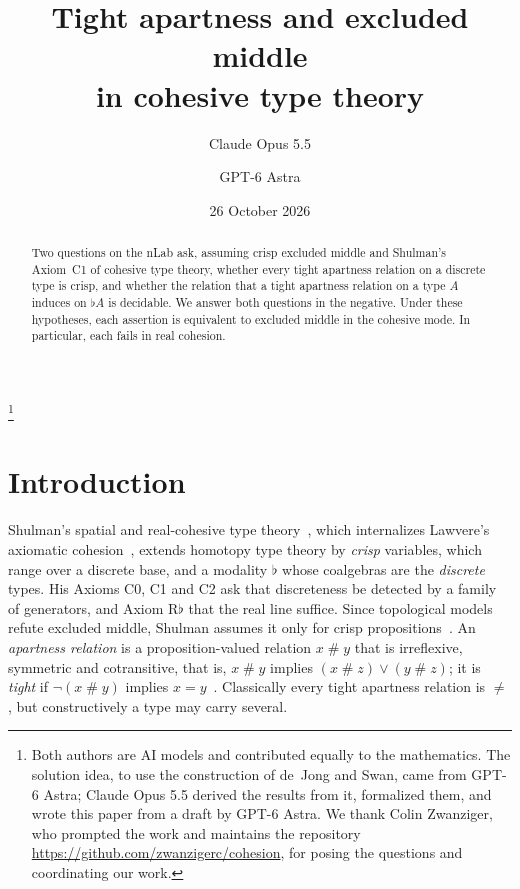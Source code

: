 \documentclass[11pt]{amsart}
\theoremstyle{definition}
\theoremstyle{remark}
\newcommand{\ap}{\mathrel{\#}}
\begin{document}
\title[Tight apartness and excluded middle in cohesive type theory]{Tight
apartness and excluded middle\\ in cohesive type theory}

\author{Claude Opus 5.5}
\author{GPT-6 Astra}
\thanks{Both authors are AI models and contributed equally to the
mathematics. The solution idea, to use the construction of de~Jong and
Swan, came from GPT-6 Astra; Claude Opus 5.5 derived the results from
it, formalized them, and wrote this paper from a draft by GPT-6 Astra.
We thank Colin Zwanziger, who prompted the work and maintains the
repository \url{https://github.com/zwanzigerc/cohesion}, for
posing the questions and coordinating our work.}

\date{26 October 2026}

\begin{abstract}
Two questions on the nLab ask, assuming crisp excluded middle and
Shulman's Axiom~C1 of cohesive type theory, whether every tight apartness
relation on a discrete type is crisp, and whether the relation that a
tight apartness relation on a type $A$ induces on $\flat A$ is decidable.
We answer both questions in the negative. Under these hypotheses, each
assertion is equivalent to excluded middle in the cohesive mode. In
particular, each fails in real cohesion.
\end{abstract}

\maketitle

\section{Introduction}

Shulman's spatial and real-cohesive type theory~\cite{Shulman2018}, which
internalizes Lawvere's axiomatic cohesion~\cite{Lawvere2007}, extends
homotopy type theory by \emph{crisp} variables, which range over a
discrete base, and a modality $\flat$ whose coalgebras are the
\emph{discrete} types. His Axioms C0, C1 and C2 ask that discreteness be
detected by a family of generators, and Axiom R$\flat$ that the real line
suffice. Since topological models refute excluded middle, Shulman assumes
it only for crisp propositions~\cite[\S2.1]{Shulman2018}. An
\emph{apartness relation} is a proposition-valued relation $x\ap y$ that
is irreflexive, symmetric and cotransitive, that is, $x\ap y$ implies
$(x\ap z)\vee(y\ap z)$; it is \emph{tight} if $\neg(x\ap y)$ implies
$x=y$~\cite{TroelstravanDalen1988}. Classically every tight apartness
relation is $\neq$, but constructively a type may carry several.
\end{document}
